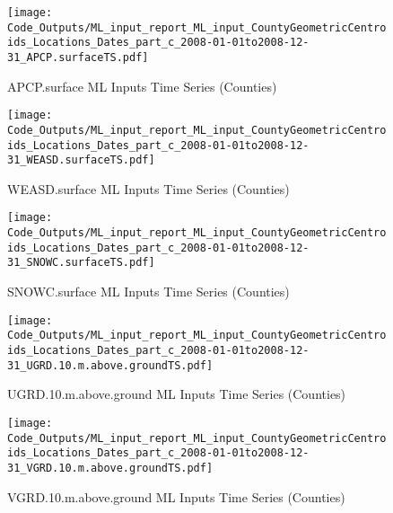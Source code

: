 \begin{figure} 
\centering  
\texttt{[image: Code\_Outputs/ML\_input\_report\_ML\_input\_CountyGeometricCentroids\_Locations\_Dates\_part\_c\_2008-01-01to2008-12-31\_APCP.surfaceTS.pdf]} 
\caption{\label{fig:ML_input_report_ML_input_CountyGeometricCentroids_Locations_Dates_part_c_2008-01-01to2008-12-31APCP.surfaceTS}APCP.surface ML Inputs Time Series (Counties)} 
\end{figure} 
 

\begin{figure} 
\centering  
\texttt{[image: Code\_Outputs/ML\_input\_report\_ML\_input\_CountyGeometricCentroids\_Locations\_Dates\_part\_c\_2008-01-01to2008-12-31\_WEASD.surfaceTS.pdf]} 
\caption{\label{fig:ML_input_report_ML_input_CountyGeometricCentroids_Locations_Dates_part_c_2008-01-01to2008-12-31WEASD.surfaceTS}WEASD.surface ML Inputs Time Series (Counties)} 
\end{figure} 
 

\begin{figure} 
\centering  
\texttt{[image: Code\_Outputs/ML\_input\_report\_ML\_input\_CountyGeometricCentroids\_Locations\_Dates\_part\_c\_2008-01-01to2008-12-31\_SNOWC.surfaceTS.pdf]} 
\caption{\label{fig:ML_input_report_ML_input_CountyGeometricCentroids_Locations_Dates_part_c_2008-01-01to2008-12-31SNOWC.surfaceTS}SNOWC.surface ML Inputs Time Series (Counties)} 
\end{figure} 
 

\begin{figure} 
\centering  
\texttt{[image: Code\_Outputs/ML\_input\_report\_ML\_input\_CountyGeometricCentroids\_Locations\_Dates\_part\_c\_2008-01-01to2008-12-31\_UGRD.10.m.above.groundTS.pdf]} 
\caption{\label{fig:ML_input_report_ML_input_CountyGeometricCentroids_Locations_Dates_part_c_2008-01-01to2008-12-31UGRD.10.m.above.groundTS}UGRD.10.m.above.ground ML Inputs Time Series (Counties)} 
\end{figure} 
 

\begin{figure} 
\centering  
\texttt{[image: Code\_Outputs/ML\_input\_report\_ML\_input\_CountyGeometricCentroids\_Locations\_Dates\_part\_c\_2008-01-01to2008-12-31\_VGRD.10.m.above.groundTS.pdf]} 
\caption{\label{fig:ML_input_report_ML_input_CountyGeometricCentroids_Locations_Dates_part_c_2008-01-01to2008-12-31VGRD.10.m.above.groundTS}VGRD.10.m.above.ground ML Inputs Time Series (Counties)} 
\end{figure} 
 

